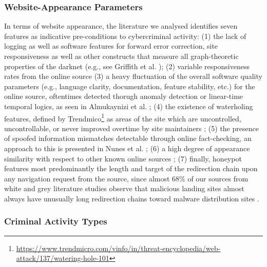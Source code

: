 \subsubsection{Website-Appearance Parameters}

In terms of website appearance, the literature we analysed identifies seven features as indicative pre-conditions to cybercriminal activity: (1) the lack of logging as well as software features for forward error correction, site responsiveness as well as other constructs that measure all graph-theoretic properties of the darknet (e.g., see Griffith et al. \cite{GriffithXR17}); (2) variable responsiveness rates from the online source \cite{} (3) a heavy fluctuation of the overall software quality parameters (e.g., language clarity, documentation, feature stability, etc.) for the online source, oftentimes detected thorugh anomaly detection or linear-time temporal logics, as seen in Almukaynizi et al. \cite{AlmukayniziPSSS18}; (4) the existence of waterholing features, defined by Trendmico\footnote{\url{https://www.trendmicro.com/vinfo/in/threat-encyclopedia/web-attack/137/watering-hole-101}} as areas of the site which are uncontrolled, uncontrollable, or never improved overtime by site maintainers \cite{KhanIJKBIES}; (5) the presence of spoofed information mismatches detectable through online fact-checking, an approach to this is presented in Nunes et al. \cite{NunesSS18}; (6) a high degree of appearance similarity with respect to other known online sources \cite{GhoshPYND17,MartineR05}; (7) finally, honeypot features most predominantly the length and target of the redirection chain upon any navigation request from the source, since almost 68\% of our sources from white and grey literature studies observe that malicious landing sites almost always have unusually long redirection chains toward malware distribution sites \cite{ChangVWL13}.

\subsubsection{Criminal Activity Types}

